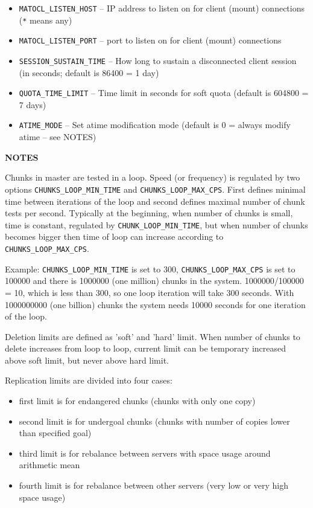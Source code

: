\documentclass[a4paper,11pt,english]{report}
\def\code#1{\texttt{#1}}
\begin{document}
\begin{itemize}
					\item \code{MATOCL\_LISTEN\_HOST}
						-- IP address to listen on for client (mount) connections (\code{*}  means any)

					\item \code{MATOCL\_LISTEN\_PORT}
						-- port to listen on for client (mount) connections

					\item \code{SESSION\_SUSTAIN\_TIME}
						-- How  long  to sustain a disconnected client session (in seconds; default is 86400 = 1 day)

					\item \code{QUOTA\_TIME\_LIMIT}
						-- Time limit in seconds for soft quota  (default  is  604800  =  7 days)
						
					\item \code{ATIME\_MODE}
						-- Set atime modification mode (default is 0 = always modify atime -- see NOTES)
				\end{itemize}
				\bigskip
				
				\textbf{NOTES}
				
					Chunks  in  master  are tested in a loop. Speed (or frequency) is
					regulated by  two  options  \code{CHUNKS\_LOOP\_MIN\_TIME}  and  \code{CHUNKS\_LOOP\_MAX\_CPS}.
					First  defines  minimal  time between iterations of the loop and second
					defines maximal number of chunk tests per  second.   Typically  at  the
					beginning,  when number of chunks is small, time is constant, regulated
					by \code{CHUNK\_LOOP\_MIN\_TIME}, but when number of chunks becomes bigger  then
					time of loop can increase according to\\
					\code{CHUNKS\_LOOP\_MAX\_CPS}.

					Example: \code{CHUNKS\_LOOP\_MIN\_TIME} is set to 300, \code{CHUNKS\_LOOP\_MAX\_CPS} is set
					to 100000 and there is 1000000 (one  million)  chunks  in  the  system.
					1000000/100000 = 10, which is less than 300, so one loop iteration will
					take 300 seconds.  With 1000000000  (one  billion)  chunks  the  system
					needs 10000 seconds for one iteration of the loop.

					Deletion  limits are defined as 'soft' and 'hard' limit. When number of
					chunks to delete increases from loop to loop, current limit can be temporary
					increased above soft limit, but never above hard limit.
					
					Replication limits are divided into four cases:
					\begin{itemize}
						\item first limit is for endangered chunks (chunks with only one copy)
						\item second limit is for undergoal chunks (chunks with number of copies lower than specified goal)
						\item third limit is for rebalance between servers with space usage around arithmetic mean
						\item fourth limit is for rebalance between other servers (very low or very high space usage)
					\end{itemize}
					
\end{document}
